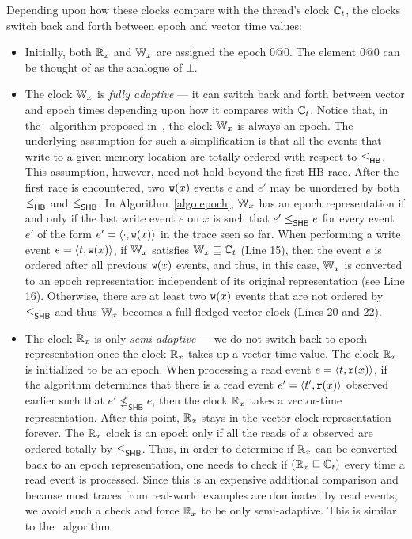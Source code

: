 Depending upon how these clocks compare with the thread's clock $\mathbb{C}_t$,
the clocks switch back and forth between epoch and vector time values:
\begin{itemize}
\item Initially, both $\mathbb{R}_x$ and $\mathbb{W}_x$ are assigned the epoch $0@0$.
The element $0@0$ can be thought of as the analogue of $\bot$.

\item
The clock $\mathbb{W}_x$ is \emph{fully adaptive} --- it can switch back
and forth between vector and epoch times depending upon how it compares with $\mathbb{C}_t$. 
Notice that, in the \fasttrack~algorithm proposed in~\cite{fasttrack},
the clock $\mathbb{W}_x$ is always an epoch.
The underlying assumption for such a simplification is that all 
the events that write to a given memory location are 
totally ordered with respect to $\leq^{}_{\mathsf{HB}}$.
This assumption, however, need not hold beyond the first HB race.
After the first race is encountered, two $\mathtt{w}(x)$ events 
$e$ and $e'$ may be unordered by both $\leq^{}_{\mathsf{HB}}$ and $\leq^{}_{\mathsf{SHB}}$.
In Algorithm~\ref{algo:epoch}, $\mathbb{W}_x$ has an epoch representation
if and only if the last write event $e$ on $x$
is such that $e' \leq^{}_{\mathsf{SHB}} e$ for every event $e'$
of the form $e' = \langle \cdot, \mathtt{w}(x)\rangle$ in the trace seen so far.
When performing a write event $e = \langle t, \mathtt{w}(x)\rangle$,
if $\mathbb{W}_x$ satisfies $\mathbb{W}_x \sqsubseteq \mathbb{C}_t$ (Line 15), 
then the event $e$ is ordered after
all previous $\mathtt{w}(x)$ events, and thus,
in this case, $\mathbb{W}_x$ is converted to an epoch representation 
independent of its original representation (see Line 16).
Otherwise, there are at least two $\mathtt{w}(x)$ events that are
not ordered by $\leq^{}_{\mathsf{SHB}}$ and thus $\mathbb{W}_x$ becomes a full-fledged vector clock
(Lines 20 and 22).

\item
The clock $\mathbb{R}_x$ is only \emph{semi-adaptive} --- we do not switch back to
epoch representation once the clock $\mathbb{R}_x$ takes up a vector-time value.
The clock $\mathbb{R}_x$ is initialized to be an epoch.
When processing a read event $e = \langle t, \mathtt{r}(x)\rangle$, if the algorithm
determines that there is a read event $e' = \langle t', \mathtt{r}(x)\rangle$ observed earlier
such that $e' \not\leq_\textsf{SHB} e$, then the clock $\mathbb{R}_x$
takes a vector-time representation.
After this point, $\mathbb{R}_x$ stays in the vector clock representation forever.
The $\mathbb{R}_x$ clock is an epoch only if 
all the reads of $x$ observed are ordered totally by $\leq^{}_{\mathsf{SHB}}$.
Thus, in order to determine if $\mathbb{R}_x$ can be converted back to an epoch representation,
one needs to check if $(\mathbb{R}_x \sqsubseteq \mathbb{C}_t)$ every time a read event is processed.
Since this is an expensive additional comparison and because most traces
from real-world examples are dominated by read events, we avoid such a check
and force $\mathbb{R}_x$ to be only semi-adaptive. 
This is similar to the \fasttrack~algorithm.
\end{itemize}
% 

